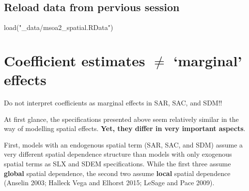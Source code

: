 \documentclass[
  letterpaper,
]{scrbook}
\newenvironment{Shaded}{\begin{snugshade}}{\end{snugshade}}
\newcommand{\FunctionTok}[1]{\textcolor[rgb]{0.28,0.35,0.67}{#1}}
\newcommand{\NormalTok}[1]{\textcolor[rgb]{0.00,0.23,0.31}{#1}}
\newcommand{\StringTok}[1]{\textcolor[rgb]{0.13,0.47,0.30}{#1}}
\begin{document}
\hypertarget{reload-data-from-pervious-session-7}{%
\subsection*{Reload data from pervious
session}\label{reload-data-from-pervious-session-7}}

\begin{Shaded}
\begin{Highlighting}[]
\FunctionTok{load}\NormalTok{(}\StringTok{"\_data/msoa2\_spatial.RData"}\NormalTok{)}
\end{Highlighting}
\end{Shaded}

\hypertarget{coefficient-estimates-neq-marginal-effects}{%
\section{\texorpdfstring{Coefficient estimates \(\neq\) `marginal'
effects}{Coefficient estimates \textbackslash neq `marginal' effects}}\label{coefficient-estimates-neq-marginal-effects}}

\begin{tcolorbox}[enhanced jigsaw, colframe=quarto-callout-warning-color-frame, coltitle=black, titlerule=0mm, opacitybacktitle=0.6, toprule=.15mm, colbacktitle=quarto-callout-warning-color!10!white, toptitle=1mm, leftrule=.75mm, colback=white, bottomtitle=1mm, opacityback=0, left=2mm, title=\textcolor{quarto-callout-warning-color}{\faExclamationTriangle}\hspace{0.5em}{Warning}, breakable, arc=.35mm, rightrule=.15mm, bottomrule=.15mm]

Do not interpret coefficients as marginal effects in SAR, SAC, and SDM!!

\end{tcolorbox}

At first glance, the specifications presented above seem relatively
similar in the way of modelling spatial effects. \textbf{Yet, they
differ in very important aspects}.

First, models with an endogenous spatial term (SAR, SAC, and SDM) assume
a very different spatial dependence structure than models with only
exogenous spatial terms as SLX and SDEM specifications. While the first
three assume \textbf{global} spatial dependence, the second two assume
\textbf{local} spatial dependence (Anselin 2003; Halleck Vega and
Elhorst 2015; LeSage and Pace 2009).
\end{document}
